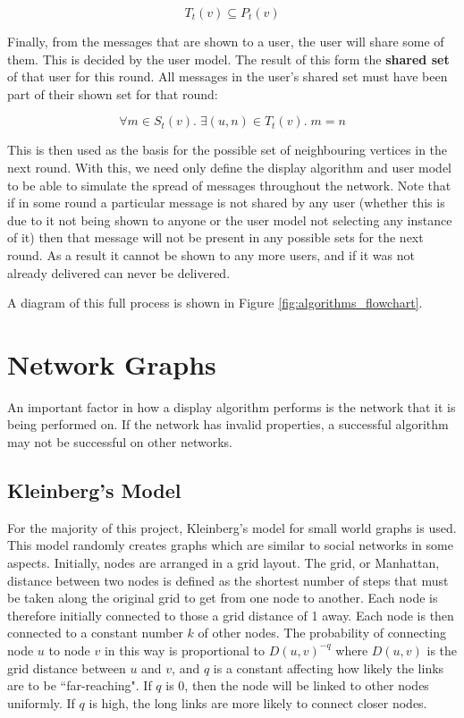 \documentclass[bsc,frontabs,twoside,singlespacing,parskip,deptreport]{infthesis}     %
\begin{document}
\begin{equation}
T_{t}(v) \subseteq P_{t}(v)
\end{equation}

Finally, from the messages that are shown to a user, the user will share some of them. This is decided by the user model. The result of this form the \textbf{shared set} of that user for this round. All messages in the user's shared set must have been part of their shown set for that round:

\begin{equation}
\forall m \in S_{t}(v) .\; \exists (u, n) \in T_{t}(v) .\; m = n
\end{equation}

This is then used as the basis for the possible set of neighbouring vertices in the next round. With this, we need only define the display algorithm and user model to be able to simulate the spread of messages throughout the network. Note that if in some round a particular message is not shared by any user (whether this is due to it not being shown to anyone or the user model not selecting any instance of it) then that message will not be present in any possible sets for the next round. As a result it cannot be shown to any more users, and if it was not already delivered can never be delivered. 

A diagram of this full process is shown in Figure \ref{fig:algorithms_flowchart}.

\section{Network Graphs} \label{sec:graph_def}
An important factor in how a display algorithm performs is the network that it is being performed on. If the network has invalid properties, a successful algorithm may not be successful on other networks.

\subsection{Kleinberg's Model}

For the majority of this project, Kleinberg's model for small world graphs is used\cite{Kleinberg00}. This model randomly creates graphs which are similar to social networks in some aspects. Initially, nodes are arranged in a grid layout. The grid, or Manhattan, distance between two nodes is defined as the shortest number of steps that must be taken along the original grid to get from one node to another. Each node is therefore initially connected to those a grid distance of 1 away. Each node is then connected to a constant number $k$ of other nodes. The probability of connecting node $u$ to node $v$ in this way is proportional to $D(u, v)^{-q}$ where $D(u, v)$ is the grid distance between $u$ and $v$, and $q$ is a constant affecting how likely the links are to be ``far-reaching". If $q$ is 0, then the node will be linked to other nodes uniformly. If $q$ is high, the long links are more likely to connect closer nodes.
\end{document}
